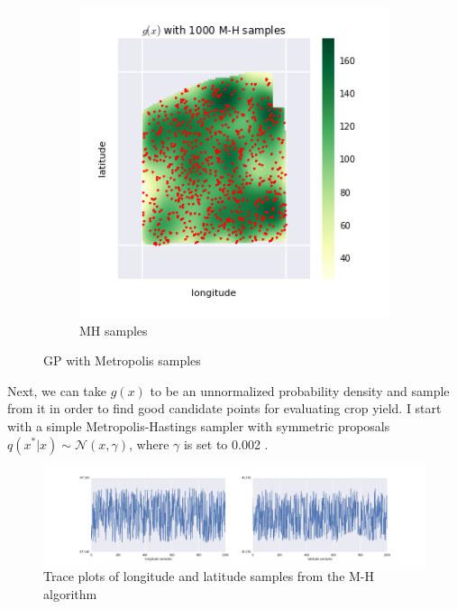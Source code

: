 \documentclass[thesis]{hmcposter}
\begin{document}
\begin{poster}
\begin{figure}
\begin{center}
\begin{subfigure}[b]{6.75in}
    \includegraphics[width=\linewidth]{figures/gp_samples}
    \caption*{MH samples}%
    \label{fig:resids_lon}
  \end{subfigure}
\label{fig:test}
\end{center}
\caption{GP with Metropolis samples}
\end{figure}

Next, we can take $g(x)$ to be an unnormalized probability density and sample from it in order to find good candidate points for evaluating crop yield. I start with a simple Metropolis-Hastings sampler with symmetric proposals $q(x^{*}|x) \sim \mathcal{N}(x, \gamma)$, where $\gamma$ is set to 0.002 \cite{chib}.

\begin{figure}
\begin{center}
\includegraphics[width=15in]{figures/trace}
\caption{Trace plots of longitude and latitude samples from the M-H algorithm}%
\label{fig:mh}
\end{center}
\end{figure}


\end{poster}
\end{document}
